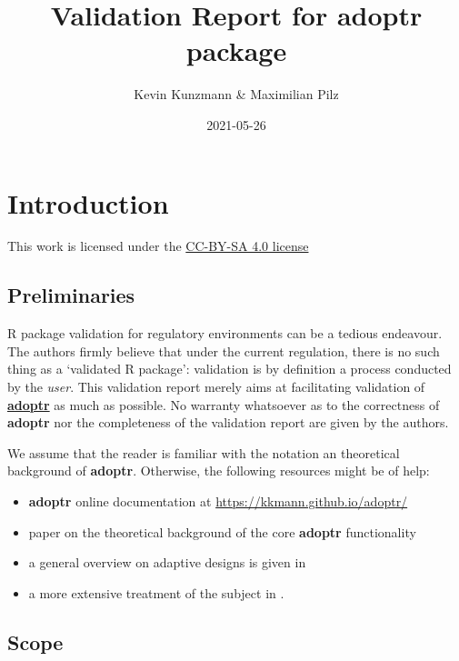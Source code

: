 \documentclass[
]{book}
\title{Validation Report for \textbf{adoptr} package}
\author{Kevin Kunzmann \& Maximilian Pilz}
\date{2021-05-26}
\providecommand{\tightlist}{%
  \setlength{\itemsep}{0pt}\setlength{\parskip}{0pt}}
\begin{document}
\maketitle

{
\setcounter{tocdepth}{1}
\tableofcontents
}
\hypertarget{introduction}{%
\chapter{Introduction}\label{introduction}}

This work is licensed under the \href{https://creativecommons.org/licenses/by-sa/4.0/deed.en}{CC-BY-SA 4.0 license}

\hypertarget{preliminaries}{%
\section{Preliminaries}\label{preliminaries}}

R package validation for regulatory environments can be a
tedious endeavour.
The authors firmly believe that under the current regulation,
there is no such thing as a `validated R package':
validation is by definition a process conducted by the \emph{user}.
This validation report merely aims at facilitating
validation of \textbf{\href{https://github.com/kkmann/adoptr}{adoptr}} as
much as possible.
No warranty whatsoever as to the correctness of \textbf{adoptr} nor the
completeness of the validation report are given by the authors.

We assume that the reader is familiar with the notation an theoretical
background of \textbf{adoptr}.
Otherwise, the following resources might be of help:

\begin{itemize}
\tightlist
\item
  \textbf{adoptr} online documentation at \url{https://kkmann.github.io/adoptr/}
\item
  paper on the theoretical background of the core \textbf{adoptr} functionality \citep{variational}
\item
  a general overview on adaptive designs is given in \citep{Bauer2015}
\item
  a more extensive treatment of the subject in \citep{Wassmer2016}.
\end{itemize}

\hypertarget{scope}{%
\section{Scope}\label{scope}}
\end{document}
